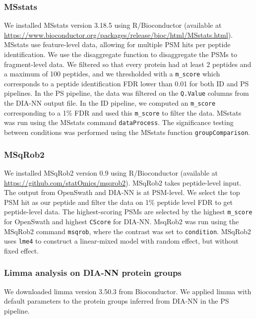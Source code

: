 \documentclass[10pt,letterpaper]{article}
\begin{document}
\subsubsection*{MSstats}

We installed MSstats version 3.18.5 using R/Bioconductor (available at \url{https://www.bioconductor.org/packages/release/bioc/html/MSstats.html}). MSstats use feature-level data, allowing for multiple PSM hits per peptide identification. We use the disaggregate function to disaggregate the PSMs to fragment-level data. We filtered so that every protein had at least 2 peptides and a maximum of 100 peptides, and we thresholded with a \texttt{m\_score} which corresponds to a peptide identification FDR lower than 0.01 for both ID and PS pipelines. In the PS pipeline, the data was filtered on the \texttt{Q.Value} columns from the DIA-NN output file. In the ID pipeline, we computed an \texttt{m\_score} corresponding to a 1\% FDR and used this \texttt{m\_score} to filter the data. MSstats was run using the MSstats command \texttt{dataProcess}. The significance testing between conditions was performed using the MSstats function \texttt{groupComparison}.  

\subsubsection*{MSqRob2}

We installed MSqRob2 version 0.9 using R/Bioconductor (available at \url{https://github.com/statOmics/msqrob2}). MSqRob2 takes peptide-level input. The output from OpenSwath and DIA-NN is at PSM-level. We select the top PSM hit as our peptide and filter the data on 1\% peptide level FDR to get peptide-level data. The highest-scoring PSMs are selected by the highest \texttt{m\_score} for OpenSwath and highest \texttt{CScore} for DIA-NN. MsqRob2 was run using the MSqRob2 command \texttt{msqrob}, where the contrast was set to \texttt{condition}.
MSqRob2 uses \texttt{lme4} to construct a linear-mixed model with random effect, but without fixed effect. 

\subsubsection*{Limma analysis on DIA-NN protein groups}

We downloaded limma\cite{limma} version 3.50.3 from Bioconductor. We applied limma with default parameters to the protein groups inferred from DIA-NN in the PS pipeline.  
\end{document}
